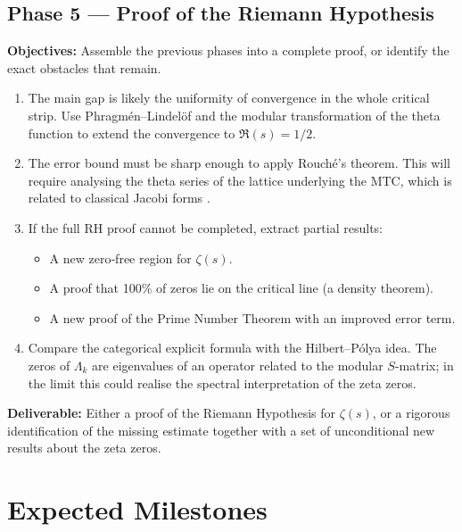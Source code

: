 \documentclass[11pt,a4paper]{article}
\theoremstyle{remark}
\begin{document}
\subsection{Phase 5 --- Proof of the Riemann Hypothesis}

\textbf{Objectives:} Assemble the previous phases into a complete proof, or identify the exact obstacles that remain.

\begin{enumerate}
\item The main gap is likely the uniformity of convergence in the whole critical strip.
  Use Phragmén–Lindelöf and the modular transformation of the theta function to extend the convergence to \(\Re(s)=1/2\).
\item The error bound must be sharp enough to apply Rouché’s theorem.
  This will require analysing the theta series of the lattice underlying the MTC, which is related to classical Jacobi forms \cite{huang2019}.
\item If the full RH proof cannot be completed, extract partial results:
  \begin{itemize}
  \item A new zero‑free region for \(\zeta(s)\).
  \item A proof that 100\% of zeros lie on the critical line (a density theorem).
  \item A new proof of the Prime Number Theorem with an improved error term.
  \end{itemize}
\item Compare the categorical explicit formula with the Hilbert–Pólya idea.
  The zeros of \(\Lambda_k\) are eigenvalues of an operator related to the modular \(S\)-matrix; in the limit this could realise the spectral interpretation of the zeta zeros.
\end{enumerate}

\textbf{Deliverable:} Either a proof of the Riemann Hypothesis for \(\zeta(s)\), or a rigorous identification of the missing estimate together with a set of unconditional new results about the zeta zeros.

\section{Expected Milestones}
\end{document}

